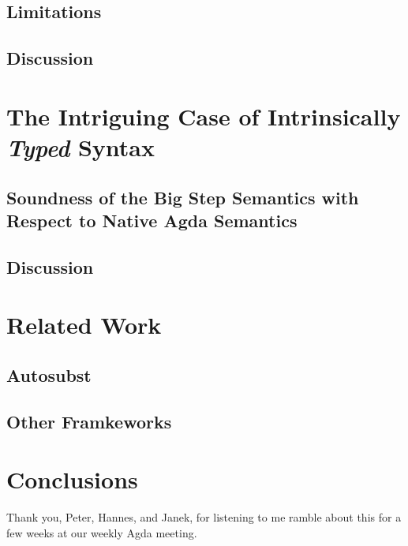 \documentclass[screen,nonacm]{acmart}
\begin{document}
\subsection{Limitations}\label{sec:limitations}

\subsection{Discussion}\label{sec:discussion-2}

\section{The Intriguing Case of Intrinsically \emph{Typed} Syntax}\label{sec:intrinsic}

\subsection{Soundness of the Big Step Semantics with Respect to Native Agda Semantics}\label{sec:soundness}

\subsection{Discussion}\label{sec:discussion-3}

\section{Related Work}\label{sec:related-work}

\subsection{Autosubst}\label{sec:autosubst}

\citet{10.1145/3293880.3294101}

\subsection{Other Framkeworks}\label{sec:related-frameworks}

\section{Conclusions}\label{sec:conclusions}

\begin{acks}
  Thank you, Peter, Hannes, and Janek, for listening to me ramble about this for a few weeks at our weekly Agda meeting.
\end{acks}



\end{document}
